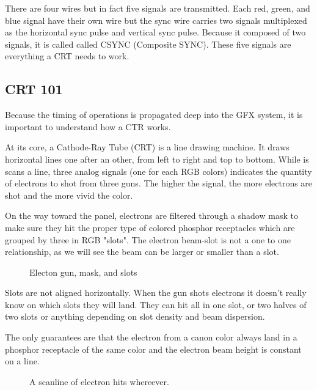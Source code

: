There are four wires but in fact five signals are transmitted. Each red, green, and blue signal have their own wire but the sync wire carries two signals multiplexed as the horizontal sync pulse and vertical sync pulse. Because it composed of two signals, it is called called CSYNC (Composite SYNC). 
These five signals are everything a CRT needs to work. 

\subsection{CRT 101}

Because the timing of operations is propagated deep into the GFX system, it is important to understand how a CTR works.

At its core, a Cathode-Ray Tube (CRT) is a line drawing machine. It draws horizontal lines one after an other, from left to right and top to bottom. While is scans a line, three analog signals (one for each RGB colors) indicates the quantity of electrons to shot from three guns. The higher the signal, the more electrons are shot and the more vivid the color.


On the way toward the panel, electrons are filtered through a shadow mask to make sure they hit the proper type of colored phosphor receptacles which are grouped by three in RGB "slots". The electron beam-slot is not a one to one relationship, as we will see the beam can be larger or smaller than a slot.





\begin{figure}[H]
\caption*{Electon gun, mask, and slots}
\end{figure}

Slots are not aligned horizontally. When the gun shots electrons it doesn't really know on which slots they will land. They can hit all in one slot, or two halves of two slots or anything depending on slot density and beam dispersion. 

The only guarantees are that the electron from a canon color always land in a phosphor receptacle of the same color and the electron beam height is constant on a line.

\begin{figure}[H]
\caption*{A scanline of electron hits whereever.}
\end{figure}

